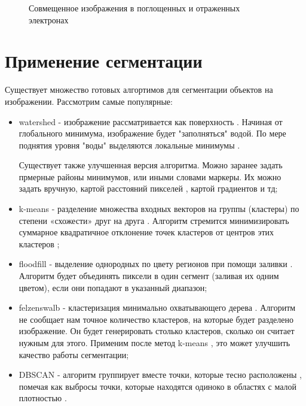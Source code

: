 \documentclass[a4paper, 14pt]{article}
\begin{document}
\begin{figure}[h]
\begin{center}
\begin{minipage}[h]{0.4\linewidth}
\caption{Совмещенное изображения в поглощенных и отраженных электронах}
\label{fig:combine2}
		\end{minipage}
	\end{center}
\end{figure}

	
	\section{Применение сегментации}
	Существует множество готовых алгортимов для сегментации объектов на изображении. 
	Рассмотрим самые популярные:
	
		\begin{itemize}
		
		\item  watershed - изображение рассматривается 
		как поверхность \cite{habr_watershed}. Начиная от глобального минимума, изображение будет "заполняться"  водой. 
		По мере поднятия уровня "воды" выделяются локальные минимумы .
		
		Существует также улучшенная версия алгоритма.
		Можно заранее задать прмерные районы минимумов, или иными словами маркеры. 
		Их можно задать вручную, картой расстояний пикселей , 
		картой градиентов  и тд;
		
		\item k-means -  разделение множества входных векторов на группы (кластеры)
		 по степени «схожести» друг на друга \cite{habr_k-means}. Алгоритм стремится минимизировать суммарное квадратичное отклонение точек кластеров от центров этих кластеров ; 
		
		\item floodfill -  выделение однородных по цвету регионов при помощи заливки \cite{habr_watershed}. Алгоритм будет объединять пиксели в один сегмент (заливая их одним цветом), если они попадают в указанный диапазон;
		
		\item felzenswalb -  кластеризация минимально охватывающего дерева \cite{felz_link}. 
		Алгоритм не сообщает нам точное количество кластеров, на которые будет разделено изображение. Он будет генерировать столько кластеров, сколько он считает нужным для этого. 
		Применим после метод k-means , это может улучшить качество работы сегментации;
		
		\item DBSCAN - алгоритм группирует вместе точки, которые тесно расположены , помечая как выбросы точки, которые находятся одиноко в областях с малой плотностью \cite{dbscan}.
		

		
	\end{itemize}
\end{document}

